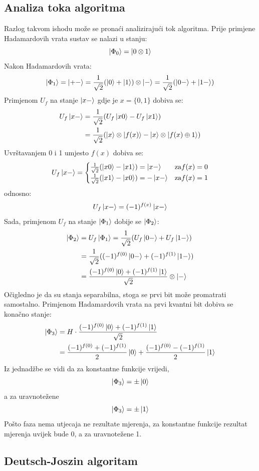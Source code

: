 \subsection{Analiza toka algoritma}
Razlog takvom ishodu može se pronaći analizirajući tok algoritma. Prije primjene Hadamardovih vrata sustav se nalazi u stanju:
\[
\ket{\Phi_0} = \ket{0\otimes 1}
\]
Nakon Hadamardovih vrata:
\[
\ket{\Phi_1} = \ket{+-} = \frac{1}{\sqrt{2}}(\ket{0} + \ket{1})\otimes\ket{-}
= \frac{1}{\sqrt{2}}(\ket{0-} + \ket{1-})
\]
Primjenom $U_f$ na stanje $\ket{x-}$ gdje je $x = \{0, 1\}$ dobiva se:
\begin{align*}
U_f\ket{x-} &= \frac{1}{\sqrt{2}}(U_f\ket{x0} - U_f\ket{x1}) \\
&= \frac{1}{\sqrt{2}}(\ket{x}\otimes\ket{f(x)} - \ket{x}\otimes\ket{f(x)\oplus 1})
\end{align*}
Uvrštavanjem 0 i 1 umjesto $f(x)$ dobiva se:
\[
U_f\ket{x-} =
\begin{cases}
\frac{1}{\sqrt{2}}(\ket{x0} - \ket{x1}) = \ket{x-} & \text{za} f(x) = 0 \\
\frac{1}{\sqrt{2}}(\ket{x1} - \ket{x0}) = -\ket{x-} & \text{za} f(x) = 1
\end{cases}
\]
odnosno:
\[
U_f\ket{x-} = (-1)^{f(x)}\ket{x-}
\]
Sada, primjenom $U_f$ na stanje $\ket{\Phi_1}$ dobije se $\ket{\Phi_2}$:
\begin{align*}
\ket{\Phi_2} &= U_f\ket{\Phi_1} = \frac{1}{\sqrt{2}}(U_f\ket{0-}+U_f\ket{1-}) \\
&= \frac{1}{\sqrt{2}}((-1)^{f(0)}\ket{0-} + (-1)^{f(1)}\ket{1-}) \\
&= \frac{(-1)^{f(0)}\ket{0} + (-1)^{f(1)}\ket{1}}{\sqrt{2}}\otimes\ket{-}
\end{align*}
Očigledno je da su stanja separabilna, stoga se prvi bit može promatrati samostalno. Primjenom Hadamardovih vrata na prvi kvantni bit dobiva se konačno stanje:
\begin{align*}
\ket{\Phi_3} &= H\cdot \frac{(-1)^{f(0)}\ket{0} + (-1)^{f(1)}\ket{1}}{\sqrt{2}} \\
&= \frac{(-1)^{f(0)}+(-1)^{f(1)}}{2}\ket{0} + \frac{(-1)^{f(0)}-(-1)^{f(1)}}{2}\ket{1}
\end{align*}
Iz jednadžbe se vidi da za konstantne funkcije vrijedi,
\[
\ket{\Phi_3} = \pm\ket{0}
\]
a za uravnotežene
\[
\ket{\Phi_3} = \pm\ket{1}
\]
Pošto faza nema utjecaja ne rezultate mjerenja, za konstantne funkcije rezultat mjerenja uvijek bude 0, a za uravnotežene 1.

\subsection{Deutsch-Joszin algoritam}

